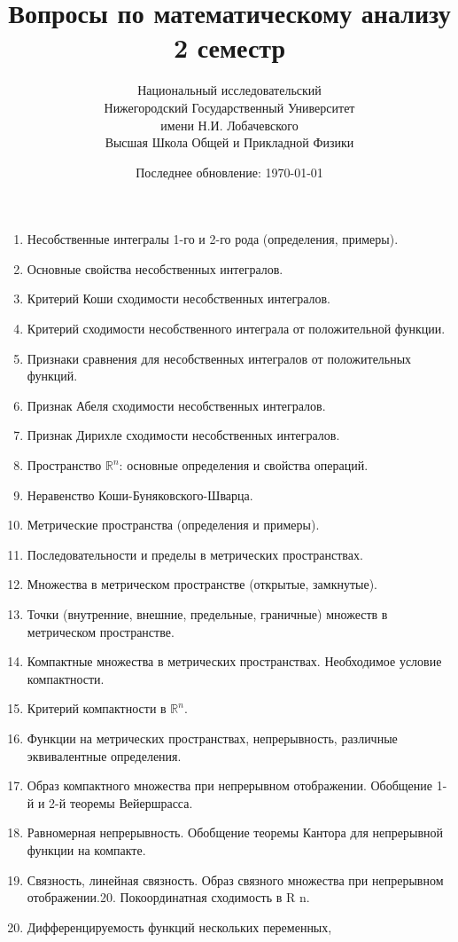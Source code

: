 \documentclass{article}
\title{Вопросы по математическому анализу \\ 2 семестр}
\date{Последнее обновление: \today}
\author{Национальный исследовательский \\
Нижегородский Государственный Университет \\
имени Н.И. Лобачевского \vspace{0.5em} \\
Высшая Школа Общей и Прикладной Физики \vspace{0.5em}}
\begin{document}
\maketitle
\begin{enumerate}
    \item Несобственные интегралы 1-го и 2-го рода (определения,
          примеры).
    \item Основные свойства несобственных интегралов.
    \item Критерий Коши сходимости несобственных интегралов.
    \item Критерий сходимости несобственного интеграла от
          положительной функции.
    \item Признаки сравнения для несобственных интегралов от
          положительных функций.
    \item Признак Абеля сходимости несобственных интегралов.
    \item Признак Дирихле сходимости несобственных интегралов.
    \item Пространство $\mathbb{R}^n$: основные определения и свойства операций.
    \item Неравенство Коши-Буняковского-Шварца.
    \item Метрические пространства (определения и примеры).
    \item Последовательности и пределы в метрических пространствах.
    \item Множества в метрическом пространстве (открытые, замкнутые).
    \item Точки (внутренние, внешние, предельные, граничные) множеств
          в метрическом пространстве.
    \item Компактные множества в метрических пространствах.
          Необходимое условие компактности.
    \item Критерий компактности в $\mathbb{R}^n$.
    \item Функции на метрических пространствах, непрерывность,
          различные эквивалентные определения.
    \item Образ компактного множества при непрерывном отображении.
          Обобщение 1-й и 2-й теоремы Вейершрасса.
    \item Равномерная непрерывность. Обобщение теоремы Кантора для
          непрерывной функции на компакте.
    \item Связность, линейная связность. Образ связного множества при
          непрерывном отображении.20. Покоординатная сходимость в R n.
    \item Дифференцируемость функций нескольких переменных,

\end{enumerate}
\end{document}
